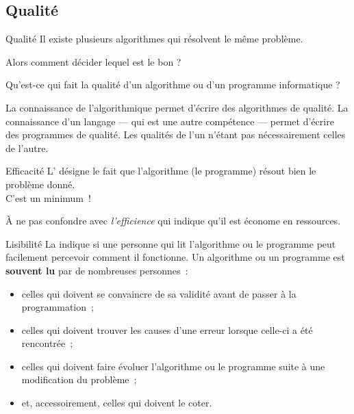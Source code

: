 \begin{hideedit}
\subsection{Qualité}
\begin{frame}{Qualité}
  Il existe plusieurs algorithmes qui résolvent le même problème.

  Alors comment décider lequel est le bon ?

  Qu'est-ce qui fait la qualité d'un algorithme ou d'un programme
  informatique ?

  La connaissance de l'algorithmique permet d'écrire des algorithmes de
  qualité. La connaissance d'un langage --- qui est une autre compétence
  --- permet d'écrire des programmes de qualité. Les qualités de l'un
  n'étant pas nécessairement celles de l'autre.
\end{frame}

\begin{frame}{Efficacité}
  L’
  désigne le fait que l’algorithme (le programme) résout bien le
  problème donné.\\
  C’est un minimum~!

  À ne pas confondre avec \emph{l’efficience}
  qui indique qu’il est économe en ressources.
\end{frame}

\begin{frame}{Lisibilité}
  La  indique si une personne qui lit l’algorithme
  ou le programme peut facilement percevoir comment il fonctionne.
  Un algorithme ou un programme est \textbf{souvent
  lu} par de nombreuses personnes~:
  \begin{itemize}
    \item
      celles qui doivent se convaincre de sa validité
      avant de passer à la programmation~;
    \item
      celles qui doivent trouver les causes
      d’une erreur lorsque celle-ci a été rencontrée~;
    \item
      celles qui doivent faire évoluer l’algorithme
      ou le programme suite à une modification
      du problème~;
    \item
      et, accessoirement, celles qui doivent le coter.
  \end{itemize}



\end{frame}
\end{hideedit}
